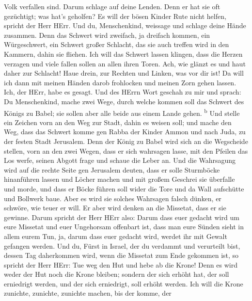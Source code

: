 Volk verfallen sind. Darum schlage auf deine Lenden. 
Denn er hat sie oft gezüchtigt; was hat's geholfen? Es will der bösen
Kinder Rute nicht helfen, spricht der Herr HErr.  Und du,
Menschenkind, weissage und schlage deine Hände zusammen. Denn das
Schwert wird zweifach, ja dreifach kommen, ein Würgeschwert, ein Schwert
großer Schlacht, das sie auch treffen wird in den Kammern, dahin sie
fliehen.  Ich will das Schwert lassen klingen, dass die
Herzen verzagen und viele fallen sollen an allen ihren Toren. Ach, wie
glänzt es und haut daher zur Schlacht!  Haue drein, zur
Rechten und Linken, was vor dir ist!  Da will ich dann
mit meinen Händen darob frohlocken und meinen Zorn gehen lassen. Ich,
der HErr, habe es gesagt.  Und des HErrn Wort geschah zu
mir und sprach:  Du Menschenkind, mache zwei Wege, durch
welche kommen soll das Schwert des Königs zu Babel; sie sollen aber alle
beide aus einem Lande gehen. \textsuperscript{b}  Und
stelle ein Zeichen vorn an den Weg zur Stadt, dahin es weisen soll; und
mache den Weg, dass das Schwert komme gen Rabba der Kinder Ammon und
nach Juda, zu der festen Stadt Jerusalem.  Denn der König
zu Babel wird sich an die Wegscheide stellen, vorn an den zwei Wegen,
dass er sich wahrsagen lasse, mit den Pfeilen das Los werfe, seinen
Abgott frage und schaue die Leber an.  Und die Wahrsagung
wird auf die rechte Seite gen Jerusalem deuten, dass er solle Sturmböcke
hinanführen lassen und Löcher machen und mit großem Geschrei sie
überfalle und morde, und dass er Böcke führen soll wider die Tore und da
Wall aufschütte und Bollwerk baue.  Aber es wird sie
solches Wahrsagen falsch dünken, er schwöre, wie teuer er will. Er aber
wird denken an die Missetat, dass er sie gewinne.  Darum
spricht der Herr HErr also: Darum dass euer gedacht wird um eure
Missetat und euer Ungehorsam offenbart ist, dass man eure Sünden sieht
in allem eurem Tun, ja, darum dass euer gedacht wird, werdet ihr mit
Gewalt gefangen werden.  Und du, Fürst in Israel, der du
verdammt und verurteilt bist, dessen Tag daherkommen wird, wenn die
Missetat zum Ende gekommen ist,  so spricht der Herr
HErr: Tue weg den Hut und hebe ab die Krone! Denn es wird weder der Hut
noch die Krone bleiben; sondern der sich erhöht hat, der soll erniedrigt
werden, und der sich erniedrigt, soll erhöht werden.  Ich
will die Krone zunichte, zunichte, zunichte machen, bis der komme, der

